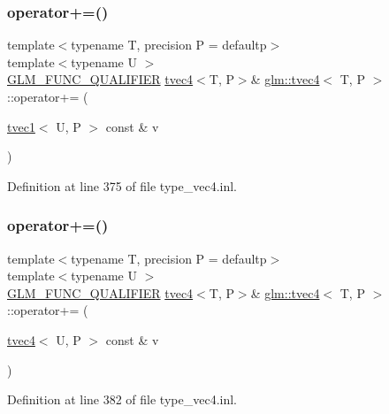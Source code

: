 \subsubsection{\texorpdfstring{operator+=()}{operator+=()}\hspace{0.1cm}{\footnotesize\ttfamily [5/6]}}
{\footnotesize\ttfamily template$<$typename T, precision P = defaultp$>$ \\
template$<$typename U $>$ \\
\mbox{\hyperlink{setup_8hpp_a33fdea6f91c5f834105f7415e2a64407}{G\+L\+M\+\_\+\+F\+U\+N\+C\+\_\+\+Q\+U\+A\+L\+I\+F\+I\+ER}} \mbox{\hyperlink{structglm_1_1tvec4}{tvec4}}$<$T, P$>$\& \mbox{\hyperlink{structglm_1_1tvec4}{glm\+::tvec4}}$<$ T, P $>$\+::operator+= (\begin{DoxyParamCaption}\item[{\mbox{\hyperlink{structglm_1_1tvec1}{tvec1}}$<$ U, P $>$ const \&}]{v }\end{DoxyParamCaption})}



Definition at line 375 of file type\+\_\+vec4.\+inl.

\mbox{\label{structglm_1_1tvec4_a7f4b03466df6bcba831d4cfac6df8405}} 
\subsubsection{\texorpdfstring{operator+=()}{operator+=()}\hspace{0.1cm}{\footnotesize\ttfamily [6/6]}}
{\footnotesize\ttfamily template$<$typename T, precision P = defaultp$>$ \\
template$<$typename U $>$ \\
\mbox{\hyperlink{setup_8hpp_a33fdea6f91c5f834105f7415e2a64407}{G\+L\+M\+\_\+\+F\+U\+N\+C\+\_\+\+Q\+U\+A\+L\+I\+F\+I\+ER}} \mbox{\hyperlink{structglm_1_1tvec4}{tvec4}}$<$T, P$>$\& \mbox{\hyperlink{structglm_1_1tvec4}{glm\+::tvec4}}$<$ T, P $>$\+::operator+= (\begin{DoxyParamCaption}\item[{\mbox{\hyperlink{structglm_1_1tvec4}{tvec4}}$<$ U, P $>$ const \&}]{v }\end{DoxyParamCaption})}



Definition at line 382 of file type\+\_\+vec4.\+inl.

